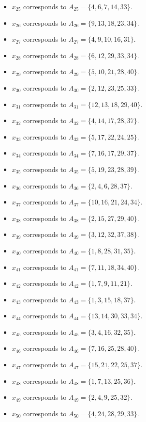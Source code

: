\documentclass[11pt]{article}
\begin{document}
\begin{itemize}
\item $x_{25}$ corresponds to $A_{25}=\{4, 6, 7, 14, 33\}$.
\item $x_{26}$ corresponds to $A_{26}=\{9, 13, 18, 23, 34\}$.
\item $x_{27}$ corresponds to $A_{27}=\{4, 9, 10, 16, 31\}$.
\item $x_{28}$ corresponds to $A_{28}=\{6, 12, 29, 33, 34\}$.
\item $x_{29}$ corresponds to $A_{29}=\{5, 10, 21, 28, 40\}$.
\item $x_{30}$ corresponds to $A_{30}=\{2, 12, 23, 25, 33\}$.
\item $x_{31}$ corresponds to $A_{31}=\{12, 13, 18, 29, 40\}$.
\item $x_{32}$ corresponds to $A_{32}=\{4, 14, 17, 28, 37\}$.
\item $x_{33}$ corresponds to $A_{33}=\{5, 17, 22, 24, 25\}$.
\item $x_{34}$ corresponds to $A_{34}=\{7, 16, 17, 29, 37\}$.
\item $x_{35}$ corresponds to $A_{35}=\{5, 19, 23, 28, 39\}$.
\item $x_{36}$ corresponds to $A_{36}=\{2, 4, 6, 28, 37\}$.
\item $x_{37}$ corresponds to $A_{37}=\{10, 16, 21, 24, 34\}$.
\item $x_{38}$ corresponds to $A_{38}=\{2, 15, 27, 29, 40\}$.
\item $x_{39}$ corresponds to $A_{39}=\{3, 12, 32, 37, 38\}$.
\item $x_{40}$ corresponds to $A_{40}=\{1, 8, 28, 31, 35\}$.
\item $x_{41}$ corresponds to $A_{41}=\{7, 11, 18, 34, 40\}$.
\item $x_{42}$ corresponds to $A_{42}=\{1, 7, 9, 11, 21\}$.
\item $x_{43}$ corresponds to $A_{43}=\{1, 3, 15, 18, 37\}$.
\item $x_{44}$ corresponds to $A_{44}=\{13, 14, 30, 33, 34\}$.
\item $x_{45}$ corresponds to $A_{45}=\{3, 4, 16, 32, 35\}$.
\item $x_{46}$ corresponds to $A_{46}=\{7, 16, 25, 28, 40\}$.
\item $x_{47}$ corresponds to $A_{47}=\{15, 21, 22, 25, 37\}$.
\item $x_{48}$ corresponds to $A_{48}=\{1, 7, 13, 25, 36\}$.
\item $x_{49}$ corresponds to $A_{49}=\{2, 4, 9, 25, 32\}$.
\item $x_{50}$ corresponds to $A_{50}=\{4, 24, 28, 29, 33\}$.

\end{itemize}
\end{document}
